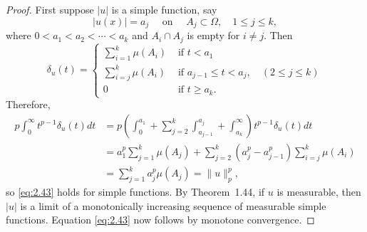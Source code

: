 \begin{proof}
  First suppose $|u|$ is a simple function, say
  \[|u(x)|=a_j \quad \text { on } \quad A_j \subset \Omega, \quad 1 \leq j \leq k,\]
  where $0<a_1<a_2<\cdots<a_k$ and $A_i \cap A_j$ is empty for $i \neq j$. Then
  \[ \delta_u(t) =
    \begin{cases}
      \sum_{i=1}^k \mu\left(A_i\right) & \text { if } t<a_1 \\
      \sum_{i=j}^k \mu\left(A_i\right) & \text { if } a_{j-1} \leq t<a_j, \quad(2 \leq j \leq k) \\
      0 & \text { if } t \geq a_k.
    \end{cases}\]
  Therefore,
  \[
  \begin{aligned}
  p \int_0^{\infty} t^{p-1} \delta_u(t) d t & =p\left(\int_0^{a_1}+\sum_{j=2}^k \int_{a_{j-1}}^{a_j}+\int_{a_k}^{\infty}\right) t^{p-1} \delta_u(t) d t \\
  & =a_1^p \sum_{j=1}^k \mu\left(A_j\right)+\sum_{j=2}^k\left(a_j^p-a_{j-1}^p\right) \sum_{i=j}^k \mu\left(A_i\right) \\
  & =\sum_{j=1}^k a_j^p \mu\left(A_j\right)=\|u\|_p^p,
  \end{aligned}
  \]
  so \eqref{eq:2.43} holds for simple functions. By Theorem~1.44, if $u$ is measurable,
  then $|u|$ is a limit of a monotonically increasing sequence of measurable simple functions.
  Equation \eqref{eq:2.43} now follows by monotone convergence.
\end{proof}


